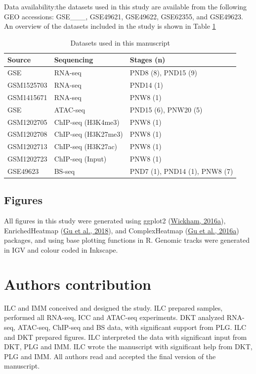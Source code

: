 \documentclass[12pt,twoside]{reedthesis}
\begin{document}
Data availability:the datasets used in this study are available from the
following GEO accessions: GSE\_\_\_, GSE49621, GSE49622,
GSE62355, and GSE49623. An overview of the datasets included in the
study is shown in Table \ref{tab:devtab1}
\begin{longtable}[t]{lll}
\caption[Datasets used in this manuscript]{\label{tab:devtab1}Datasets used in this manuscript}\\
\toprule
Source & Sequencing & Stages (n)\\
\midrule
GSE & RNA-seq & PND8 (8), PND15 (9)\\
GSM1525703 & RNA-seq & PND14 (1)\\
GSM1415671 & RNA-seq & PNW8 (1)\\
GSE & ATAC-seq & PND15 (6), PNW20 (5)\\
GSM1202705 & ChIP-seq (H3K4me3) & PNW8 (1)\\
\addlinespace
GSM1202708 & ChIP-seq (H3K27me3) & PNW8 (1)\\
GSM1202713 & ChIP-seq (H3K27ac) & PNW8 (1)\\
GSM1202723 & ChIP-seq (Input) & PNW8 (1)\\
GSE49623 & BS-seq & PND7 (1), PND14 (1), PNW8 (7)\\
\bottomrule
\end{longtable}
\hypertarget{figures}{%
\subsection{Figures}\label{figures}}

All figures in this study were generated using ggplot2 (\protect\hyperlink{ref-wickham2016}{Wickham, 2016a}),
EnrichedHeatmap (\protect\hyperlink{ref-gu2018}{Gu et al., 2018}), and ComplexHeatmap (\protect\hyperlink{ref-gu2016}{Gu et al., 2016a}) packages, and
using base plotting functions in R. Genomic tracks were generated in IGV
and colour coded in Inkscape.

\hypertarget{authors-contribution}{%
\section{Authors contribution}\label{authors-contribution}}

ILC and IMM conceived and designed the study. ILC prepared samples,
performed all RNA-seq, ICC and ATAC-seq experiments. DKT analyzed
RNA-seq, ATAC-seq, ChIP-seq and BS data, with significant support from
PLG. ILC and DKT prepared figures. ILC interpreted the data with
significant input from DKT, PLG and IMM. ILC wrote the manuscript with
significant help from DKT, PLG and IMM. All authors read and accepted
the final version of the manuscript.
\end{document}
